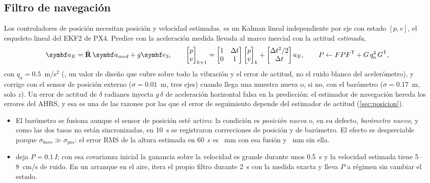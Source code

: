 \subsection{Filtro de navegación}

Los controladores de posición necesitan posición y velocidad estimadas.
 es un Kalman lineal independiente por eje con estado
$[p,v]$, el esqueleto lineal del EKF2 de PX4. Predice con la aceleración
medida llevada al marco inercial con la actitud \emph{estimada},
\begin{equation}
\vect a_E=\hat\R\,\vect a_{med}+g\eu,\qquad
\begin{bmatrix}p\\v\end{bmatrix}_{k+1}=\begin{bmatrix}1&\Delta t\\0&1\end{bmatrix}\begin{bmatrix}p\\v\end{bmatrix}_k+\begin{bmatrix}\Delta t^2/2\\ \Delta t\end{bmatrix}a_E,\qquad
P\leftarrow FPF\T+G\,q_a^2\,G\T,
\label{eq:nav}
\end{equation}
con $q_a=0.5$~m/s$^2$ (, un valor de
diseño que cubre sobre todo la vibración y el error de actitud, no el ruido
blanco del acelerómetro), y corrige con el sensor de posición externo
($\sigma=0.01$~m, tres ejes) cuando llega una muestra nueva o, si no, con
el barómetro ($\sigma=0.17$~m, solo $z$). Un error de actitud de
$\delta$ radianes inyecta $g\,\delta$ de aceleración horizontal falsa en la
predicción: el estimador de navegación hereda los errores del AHRS, y esa
es una de las razones por las que el error de seguimiento depende del
estimador de actitud (\cref{sec:posicion}).

\begin{nota}
\begin{itemize}[leftmargin=1.2em]
\item El barómetro se fusiona aunque el sensor de posición esté activo: la
condición es \emph{posición nueva} o, en su defecto, \emph{barómetro nuevo},
y como las dos tasas no están sincronizadas, en 10~s se registraron
 correcciones de posición y  de barómetro. El efecto
es despreciable porque $\sigma_{baro}\gg\sigma_{pos}$: el error RMS de la
altura estimada en 60~s es ~mm con esa fusión y ~mm
sin ella.
\item {} deja $P=0.1\,I$; con esa covarianza inicial la ganancia
sobre la velocidad es grande durante unos 0.5~s y la velocidad estimada
tiene 5--8~cm/s de ruido. En un arranque en el aire,
 itera el propio filtro durante 2~s con la medida
exacta y lleva $P$ a régimen sin cambiar el estado.
\end{itemize}
\end{nota}
